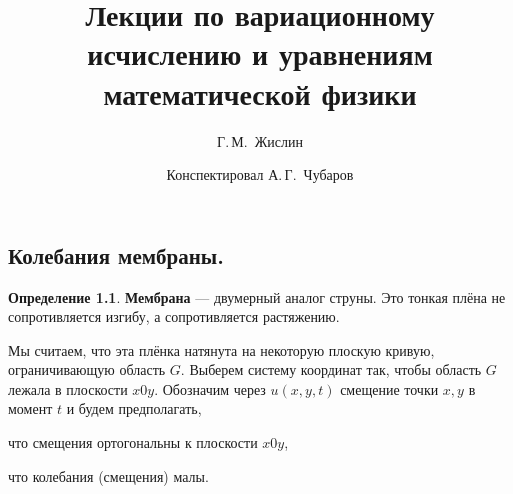 \documentclass[12pt,a4paper,openany,fleqn]{book}
\newcommand{\mc}[1]{\ensuremath{\mathcal{#1}}}
\theoremstyle{definition}
\newtheorem{_def}{Определение}[section]
\begin{document}
	\author{Г.\,М.~Жислин}
	\title{Лекции по вариационному исчислению и уравнениям математической физики}
	\date{Конспектировал А.\,Г.~Чубаров}
	
	
	
	\maketitle
	
	
	\renewcommand{\thepart}{\Asbuk{part}}
	\renewcommand{\thechapter}{\arabic{chapter}}
	\renewcommand{\thesection}{\arabic{section}}
	\renewcommand{\thesubsection}{\Roman{subsection}}
	\renewcommand{\thefootnote}{\roman{footnote}}
	\renewcommand{\phi}{\varphi}
	\renewcommand{\Re}{\ensuremath{\mc{R}e\,}}
	\renewcommand{\Im}{\ensuremath{\mc{I}m\,}}
	
	\setcounter{chapter}{14}
	\chapter{}
	\label{lecture15}
	\section{Колебания мембраны.}
	\label{lecture15section1}
	\begin{_def}
		\textbf{Мембрана} --- двумерный аналог струны. Это тонкая плёна не сопротивляется изгибу, а сопротивляется растяжению.
	\end{_def}
	Мы считаем, что эта плёнка натянута на некоторую плоскую кривую, ограничивающую область $G$. Выберем систему координат так, чтобы область $G$ лежала в плоскости $x0y$. Обозначим через $u(x,y,t)$ смещение точки $x,y$ в момент $t$ и будем предполагать,
	\begin{enumerate1}
		\item что смещения ортогональны к плоскости $x0y$,
		\item что колебания (смещения) малы.
	\end{enumerate1}
	
	
	
	
	
\end{document}
